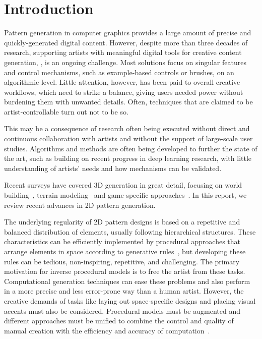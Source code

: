 \section{Introduction}
Pattern generation in computer graphics provides a large amount of precise and quickly-generated digital content. However, despite more than three decades of research, supporting artists with meaningful digital tools for creative content generation, , is an ongoing challenge. Most solutions focus on singular features and control mechanisms, such as example-based controls or brushes, on an algorithmic level. Little attention, however, has been paid to overall creative workflows, which need to strike a balance, giving users needed power without burdening them with unwanted details. Often, techniques that are claimed to be artist-controllable turn out not to be so.

This may be a consequence of research often being executed without direct and continuous collaboration with artists and without the support of large-scale user studies. Algorithms and methods are often being developed to further the state of the art, such as building on recent progress in deep learning research, with little understanding of artists' needs and how mechanisms can be validated.

Recent surveys have covered 3D generation in great detail, focusing on  world building~\cite{smelik_2014_aso, aliaga_2016_ipm}, terrain modeling~\cite{galin_2019_aro} and game-specific approaches~\cite{hendrikx_2013_pcg, togelius_2011_sbp}. In this report, we review recent advances in 2D pattern generation. 

The underlying regularity of 2D pattern designs is based on a repetitive and balanced distribution of elements, usually following hierarchical structures. These characteristics can be efficiently implemented by procedural approaches that arrange elements in space according to generative rules~\cite{stava_2010_ipm}, but developing these rules can be tedious, non-inspiring, repetitive, and challenging. The primary motivation for inverse procedural models is to free the artist from these tasks. Computational generation techniques can ease these problems and also perform in a more precise and less error-prone way than a human artist. However, the creative demands of tasks like laying out space-specific designs and placing visual accents must also be considered. Procedural models must be augmented and different approaches must be unified to combine the control and quality of manual creation with the efficiency and accuracy of computation~\cite{gieseke_2017_ooo}. 

